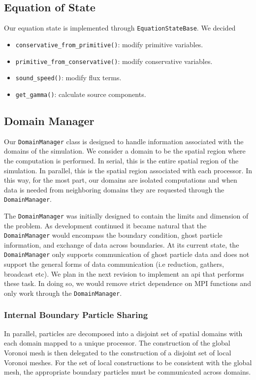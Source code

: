 \subsection{Equation of State}
Our equation state is implemented through \lstinline{EquationStateBase}. We
decided 
\begin{itemize}
    \item \lstinline{conservative_from_primitive()}: modify primitive variables.
    \item \lstinline{primitive_from_conservative()}: modify conservative variables.
    \item \lstinline{sound_speed()}: modify flux terms.
    \item \lstinline{get_gamma()}: calculate source components.
\end{itemize}


\subsection{Domain Manager}
Our \lstinline{DomainManager} class is designed to handle information associated with
the domains of the simulation. We consider a domain to be the spatial region where the computation
is performed. In serial, this is the entire spatial region of the simulation.
In parallel, this is the spatial region associated with each processor. 
In this way, for the most part, our domains are isolated computations and when
data is needed from neighboring domains they are requested through the \lstinline{DomainManager}.

The \lstinline{DomainManager} was initially designed to contain the limits and dimension of
the problem. As development continued it became natural that the \lstinline{DomainManager} would
encompass the boundary condition, ghost particle information, and exchange of data across boundaries.
At its current state, the \lstinline{DomainManager} only supports communication of ghost particle data
and does not support the general forms of data communication
(i.e reduction, gathers, broadcast etc). We plan in the next revision to implement an api that
performs these task. In doing so, we would remove strict dependence on MPI functions and only
work through the \lstinline{DomainManager}.

\subsubsection{Internal Boundary Particle Sharing}
In parallel, particles are decomposed into a disjoint set of spatial domains
with each domain mapped to a unique processor. The construction
of the global Voronoi mesh is then delegated to the construction of a disjoint set
of local Voronoi meshes. For the set of local constructions to be consistent
with the global mesh, the appropriate boundary particles must be 
communicated across domains.

